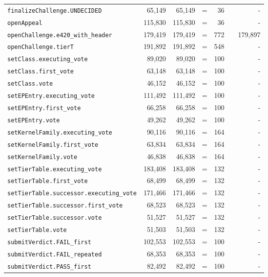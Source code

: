 \documentclass[10pt]{article}
\begin{document}
{\begin{longtable}{@{}lrrlrcr@{}}
\quad\texttt{finalizeChallenge.UNDECIDED} & 65{,}149 & 65{,}149 & = & 36 &  & - \\
\quad\texttt{openAppeal} & 115{,}830 & 115{,}830 & = & 36 &  & - \\
\quad\texttt{openChallenge.e420\_with\_header} & 179{,}419 & 179{,}419 & = & 772 &  & 179{,}897 \\
\quad\texttt{openChallenge.tierT} & 191{,}892 & 191{,}892 & = & 548 &  & - \\
\quad\texttt{setClass.executing\_vote} & 89{,}020 & 89{,}020 & = & 100 &  & - \\
\quad\texttt{setClass.first\_vote} & 63{,}148 & 63{,}148 & = & 100 &  & - \\
\quad\texttt{setClass.vote} & 46{,}152 & 46{,}152 & = & 100 &  & - \\
\quad\texttt{setEPEntry.executing\_vote} & 111{,}492 & 111{,}492 & = & 100 &  & - \\
\quad\texttt{setEPEntry.first\_vote} & 66{,}258 & 66{,}258 & = & 100 &  & - \\
\quad\texttt{setEPEntry.vote} & 49{,}262 & 49{,}262 & = & 100 &  & - \\
\quad\texttt{setKernelFamily.executing\_vote} & 90{,}116 & 90{,}116 & = & 164 &  & - \\
\quad\texttt{setKernelFamily.first\_vote} & 63{,}834 & 63{,}834 & = & 164 &  & - \\
\quad\texttt{setKernelFamily.vote} & 46{,}838 & 46{,}838 & = & 164 &  & - \\
\quad\texttt{setTierTable.executing\_vote} & 183{,}408 & 183{,}408 & = & 132 &  & - \\
\quad\texttt{setTierTable.first\_vote} & 68{,}499 & 68{,}499 & = & 132 &  & - \\
\quad\texttt{setTierTable.successor.executing\_vote} & 171{,}466 & 171{,}466 & = & 132 &  & - \\
\quad\texttt{setTierTable.successor.first\_vote} & 68{,}523 & 68{,}523 & = & 132 &  & - \\
\quad\texttt{setTierTable.successor.vote} & 51{,}527 & 51{,}527 & = & 132 &  & - \\
\quad\texttt{setTierTable.vote} & 51{,}503 & 51{,}503 & = & 132 &  & - \\
\quad\texttt{submitVerdict.FAIL\_first} & 102{,}553 & 102{,}553 & = & 100 &  & - \\
\quad\texttt{submitVerdict.FAIL\_repeated} & 68{,}353 & 68{,}353 & = & 100 &  & - \\
\quad\texttt{submitVerdict.PASS\_first} & 82{,}492 & 82{,}492 & = & 100 &  & - \\

\end{longtable}}
\end{document}
